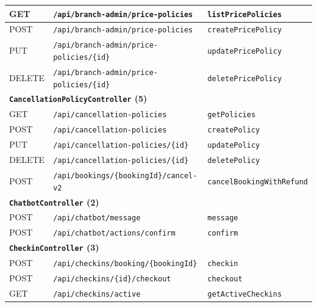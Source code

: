 {\begin{longtable}{|p{1.5cm}|p{7.3cm}|p{5.0cm}|}
\hline
GET & \texttt{/\allowbreak api/\allowbreak branch-admin/\allowbreak price-policies} & \texttt{listPricePolicies} \\
\hline
POST & \texttt{/\allowbreak api/\allowbreak branch-admin/\allowbreak price-policies} & \texttt{createPricePolicy} \\
\hline
PUT & \texttt{/\allowbreak api/\allowbreak branch-admin/\allowbreak price-policies/\allowbreak \{id\}} & \texttt{updatePricePolicy} \\
\hline
DELETE & \texttt{/\allowbreak api/\allowbreak branch-admin/\allowbreak price-policies/\allowbreak \{id\}} & \texttt{deletePricePolicy} \\
\hline
\multicolumn{3}{|l|}{\textbf{\texttt{CancellationPolicyController} (5)}} \\
\hline
GET & \texttt{/\allowbreak api/\allowbreak cancellation-policies} & \texttt{getPolicies} \\
\hline
POST & \texttt{/\allowbreak api/\allowbreak cancellation-policies} & \texttt{createPolicy} \\
\hline
PUT & \texttt{/\allowbreak api/\allowbreak cancellation-policies/\allowbreak \{id\}} & \texttt{updatePolicy} \\
\hline
DELETE & \texttt{/\allowbreak api/\allowbreak cancellation-policies/\allowbreak \{id\}} & \texttt{deletePolicy} \\
\hline
POST & \texttt{/\allowbreak api/\allowbreak bookings/\allowbreak \{bookingId\}/\allowbreak cancel-v2} & \texttt{cancelBookingWithRefund} \\
\hline
\multicolumn{3}{|l|}{\textbf{\texttt{ChatbotController} (2)}} \\
\hline
POST & \texttt{/\allowbreak api/\allowbreak chatbot/\allowbreak message} & \texttt{message} \\
\hline
POST & \texttt{/\allowbreak api/\allowbreak chatbot/\allowbreak actions/\allowbreak confirm} & \texttt{confirm} \\
\hline
\multicolumn{3}{|l|}{\textbf{\texttt{CheckinController} (3)}} \\
\hline
POST & \texttt{/\allowbreak api/\allowbreak checkins/\allowbreak booking/\allowbreak \{bookingId\}} & \texttt{checkin} \\
\hline
POST & \texttt{/\allowbreak api/\allowbreak checkins/\allowbreak \{id\}/\allowbreak checkout} & \texttt{checkout} \\
\hline
GET & \texttt{/\allowbreak api/\allowbreak checkins/\allowbreak active} & \texttt{getActiveCheckins} \\

\end{longtable}}
